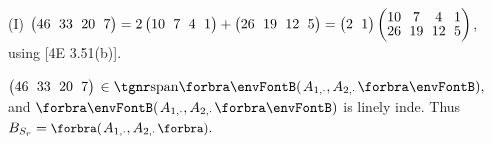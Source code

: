 (I) {\normalsize$\begin{pmatrix} 46 &\hspace{-4pt} 33 &\hspace{-4pt} 20 &\hspace{-4pt} 7 \end{pmatrix}=2\begin{pmatrix} 10 &\hspace{-4pt} 7 &\hspace{-4pt} 4 &\hspace{-4pt} 1\end{pmatrix}+\begin{pmatrix} 26 &\hspace{-4pt} 19 &\hspace{-4pt} 12 &\hspace{-4pt} 5\end{pmatrix}=\begin{pmatrix}2 &\hspace{-4pt} 1\end{pmatrix}\begin{pmatrix} 10 &\hspace{-4pt} 7 &\hspace{-4pt} 4 &\hspace{-4pt} 1\\[-2pt] 26 &\hspace{-4pt} 19 &\hspace{-4pt} 12 &\hspace{-4pt} 5\end{pmatrix}$}, using [4E 3.51(b)].\vspace{3pt}\par\quad\HI
{\small$\begin{pmatrix} 46 &\hspace{-4pt} 33 &\hspace{-4pt} 20 &\hspace{-4pt} 7 \end{pmatrix}$}${}\in\Span{A_{1,\cdot},A_{2,\cdot}},$ and $\Par{A_{1,\cdot},A_{2,\cdot}}$ is linely inde. Thus $B_{S_r}=\BigPar{A_{1,\cdot},A_{2,\cdot}}.$\par\vspace{6pt}\quad\EndI

